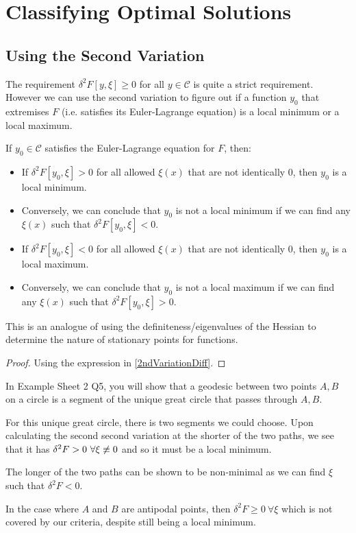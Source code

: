 \documentclass[../main.tex]{subfiles}
\begin{document}
\section{Classifying Optimal Solutions}
\subsection{Using the Second Variation}
The requirement $\delta^2 F[y, \xi] \geq 0$ for all $y \in \mathscr{C}$ is quite a strict requirement.
However we can use the second variation to figure out if a function $y_0$ that extremises $F$ (i.e. satisfies its Euler-Lagrange equation) is a local minimum or a local maximum.
\begin{proposition}
  If $y_0 \in \mathscr{C}$ satisfies the Euler-Lagrange equation for $F$, then: \label{classifyingFunct}
  \begin{itemize}
    \item If $\delta^2 F[y_0, \xi] > 0$ for all allowed $\xi(x)$ that are not identically 0, then $y_0$ is a local minimum.
    \item Conversely, we can conclude that $y_0$ is not a local minimum if we can find any $\xi(x)$ such that $\delta^2 F[y_0, \xi] < 0$.
    \item If $\delta^2 F[y_0, \xi] < 0$ for all allowed $\xi(x)$ that are not identically 0, then $y_0$ is a local maximum.
    \item Conversely, we can conclude that $y_0$ is not a local maximum if we can find any $\xi(x)$ such that $\delta^2 F[y_0, \xi] > 0$.
\end{itemize}
\end{proposition}
\begin{remark}
  This is an analogue of using the definiteness/eigenvalues of the Hessian to determine the nature of stationary points for functions.
\end{remark}
\begin{proof}
  Using the expression in \cref{2ndVariationDiff}.
\end{proof}
\begin{example}
  In Example Sheet 2 Q5, you will show that a geodesic between two points $A, B$ on a circle is a segment of the unique great circle that passes through $A, B$.

  For this unique great circle, there is two segments we could choose.
  Upon calculating the second second variation at the shorter of the two paths, we see that it has $\delta^2 F > 0\ \forall \xi \centernot\equiv 0$ and so it must be a local minimum.

  The longer of the two paths can be shown to be non-minimal as we can find $\xi$ such that $\delta^2 F < 0$.

  In the case where $A$ and $B$ are antipodal points, then $\delta^2 F \geq 0\ \forall \xi$ which is not covered by our criteria, despite still being a local minimum.
\end{example}
\end{document}
